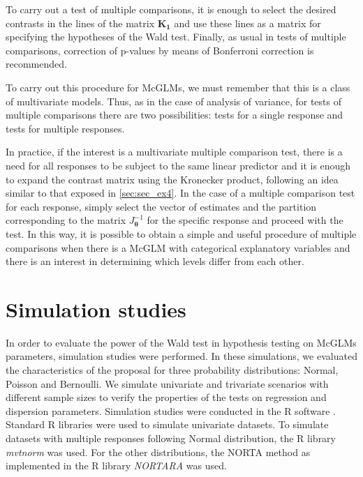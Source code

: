 \documentclass[AMA,STIX1COL]{WileyNJD-v2}
\begin{document}
To carry out a test of multiple comparisons, it is enough to select the desired contrasts in the lines of the matrix $\boldsymbol{K_1}$ and use these lines as a matrix for specifying the hypotheses of the Wald test. Finally, as usual in tests of multiple comparisons, correction of p-values by means of Bonferroni correction is recommended.

To carry out this procedure for McGLMs, we must remember that this is a class of multivariate models. Thus, as in the case of analysis of variance, for tests of multiple comparisons there are two possibilities: tests for a single response and tests for multiple responses. 

In practice, if the interest is a multivariate multiple comparison test, there is a need for all responses to be subject to the same linear predictor and it is enough to expand the contrast matrix using the Kronecker product, following an idea similar to that exposed in \autoref{sec:sec_ex4}. In the case of a multiple comparison test for each response, simply select the vector of estimates and the partition corresponding to the matrix  $J_{\boldsymbol{\theta}}^{-1}$ for the specific response and proceed with the test. In this way, it is possible to obtain a simple and useful procedure of multiple comparisons when there is a McGLM with categorical explanatory variables and there is an interest in determining which levels differ from each other.


\section{Simulation studies}\label{sec5}

In order to evaluate the power of the Wald test in hypothesis testing on McGLMs parameters, simulation studies were performed. In these simulations, we evaluated the characteristics of the proposal for three probability distributions: Normal, Poisson and Bernoulli. We simulate univariate and trivariate scenarios with different sample sizes to verify the properties of the tests on regression and dispersion parameters. Simulation studies were conducted in the R software \cite{R}. Standard R libraries were used to simulate univariate datasets. To simulate datasets with multiple responses following Normal distribution, the R library \emph{mvtnorm} \cite{mvtnorm1} \cite{mvtnorm2} was used. For the other distributions, the NORTA \cite{norta} method as implemented in the R library \emph{NORTARA} \cite{nortara} was used.
\end{document}
